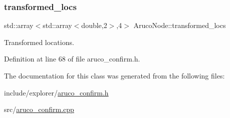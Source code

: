 \subsubsection{\texorpdfstring{transformed\+\_\+locs}{transformed\_locs}}
{\footnotesize\ttfamily std\+::array$<$std\+::array$<$double,2$>$,4$>$ Aruco\+Node\+::transformed\+\_\+locs}



Transformed locations. 



Definition at line 68 of file aruco\+\_\+confirm.\+h.



The documentation for this class was generated from the following files\+:\begin{DoxyCompactItemize}
\item 
include/explorer/\hyperlink{aruco__confirm_8h}{aruco\+\_\+confirm.\+h}\item 
src/\hyperlink{aruco__confirm_8cpp}{aruco\+\_\+confirm.\+cpp}\end{DoxyCompactItemize}
